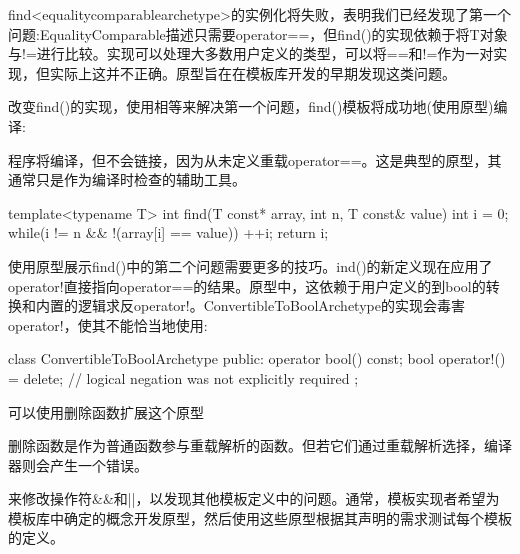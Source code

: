 find<equalitycomparablearchetype>的实例化将失败，表明我们已经发现了第一个问题:EqualityComparable描述只需要operator==，但find()的实现依赖于将T对象与!=进行比较。实现可以处理大多数用户定义的类型，可以将==和!=作为一对实现，但实际上这并不正确。原型旨在在模板库开发的早期发现这类问题。

改变find()的实现，使用相等来解决第一个问题，find()模板将成功地(使用原型)编译:

\begin{notice}
程序将编译，但不会链接，因为从未定义重载operator==。这是典型的原型，其通常只是作为编译时检查的辅助工具。
\end{notice}

\begin{cpp}
template<typename T>
int find(T const* array, int n, T const& value) {
	int i = 0;
	while(i != n && !(array[i] == value))
		++i;
	return i;
}
\end{cpp}

使用原型展示find()中的第二个问题需要更多的技巧。ind()的新定义现在应用了operator!直接指向operator==的结果。原型中，这依赖于用户定义的到bool的转换和内置的逻辑求反operator!。ConvertibleToBoolArchetype的实现会毒害operator!，使其不能恰当地使用:

\begin{cpp}
class ConvertibleToBoolArchetype
{
	public:
	operator bool() const;
	bool operator!() = delete; // logical negation was not explicitly required
};
\end{cpp}

可以使用删除函数扩展这个原型

\begin{notice}
删除函数是作为普通函数参与重载解析的函数。但若它们通过重载解析选择，编译器则会产生一个错误。
\end{notice}

来修改操作符\&\&和||，以发现其他模板定义中的问题。通常，模板实现者希望为模板库中确定的概念开发原型，然后使用这些原型根据其声明的需求测试每个模板的定义。






















